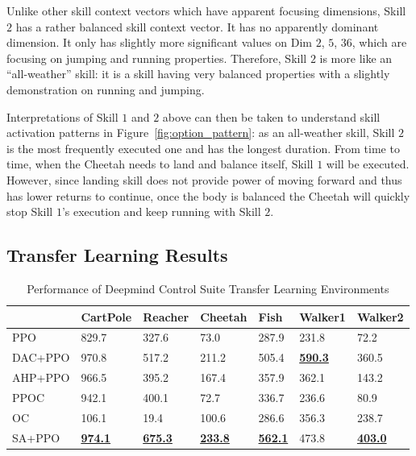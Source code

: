 Unlike other skill context vectors which have apparent focusing
dimensions, Skill $2$ has a rather balanced skill context vector.
It has no apparently dominant dimension. It only has slightly
more significant values on Dim $2$, $5$, $36$, which are focusing
on jumping and running properties. Therefore, Skill $2$ is more
like an ``all-weather'' skill: it is a skill having very balanced
properties with a slightly demonstration on running and jumping.

Interpretations of Skill $1$ and $2$ above can then be taken to
understand skill activation patterns in
Figure~\ref{fig:option_pattern}: as an all-weather skill, Skill
$2$ is the most frequently executed one and has the longest
duration. From time to time, when the Cheetah needs to land and
balance itself, Skill $1$ will be executed. However, since
landing skill does not provide power of moving forward and thus
has lower returns to continue, once the body is balanced the
Cheetah will quickly stop Skill $1$'s execution and keep running
with Skill $2$.

\subsection{Transfer Learning Results}
\label{sec:append_transfer}

\begin{table}[h]
\caption{Performance of Deepmind Control Suite Transfer Learning Environments}
\label{table:transfer}
\begin{center}
\begin{tabular}{|l|l|l|l|l|l|l|}
\hline
        & CartPole             & Reacher              & Cheetah              & Fish                 & Walker1              & Walker2              \\ \hline
PPO     & 829.7                & 327.6                & 73.0                 & 287.9                & 231.8                & 72.2                 \\ \hline
DAC+PPO & 970.8                & 517.2                & 211.2                & 505.4                & {\ul \textbf{590.3}} & 360.5                \\ \hline
AHP+PPO & 966.5                & 395.2                & 167.4                & 357.9                & 362.1                & 143.2                \\ \hline
PPOC    & 942.1                & 400.1                & 72.7                 & 336.7                & 236.6                & 80.9                 \\ \hline
OC      & 106.1                & 19.4                 & 100.6                & 286.6                & 356.3                & 238.7                \\ \hline
SA+PPO  & {\ul \textbf{974.1}} & {\ul \textbf{675.3}} & {\ul \textbf{233.8}} & {\ul \textbf{562.1}} & 473.8                & {\ul \textbf{403.0}} \\ \hline
\end{tabular}
\end{center}
\end{table}

